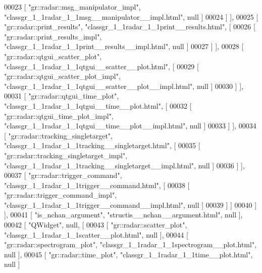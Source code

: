 \begin{DoxyCode}
00023         [ \textcolor{stringliteral}{"gr::radar::msg\_manipulator\_impl"}, \textcolor{stringliteral}{"classgr\_1\_1radar\_1\_1msg\_\_manipulator\_\_impl.html"}, null ]
00024       ] ],
00025       [ \textcolor{stringliteral}{"gr::radar::print\_results"}, \textcolor{stringliteral}{"classgr\_1\_1radar\_1\_1print\_\_results.html"}, [
00026         [ \textcolor{stringliteral}{"gr::radar::print\_results\_impl"}, \textcolor{stringliteral}{"classgr\_1\_1radar\_1\_1print\_\_results\_\_impl.html"}, null ]
00027       ] ],
00028       [ \textcolor{stringliteral}{"gr::radar::qtgui\_scatter\_plot"}, \textcolor{stringliteral}{"classgr\_1\_1radar\_1\_1qtgui\_\_scatter\_\_plot.html"}, [
00029         [ \textcolor{stringliteral}{"gr::radar::qtgui\_scatter\_plot\_impl"}, \textcolor{stringliteral}{"classgr\_1\_1radar\_1\_1qtgui\_\_scatter\_\_plot\_\_impl.html"}, null
       ]
00030       ] ],
00031       [ \textcolor{stringliteral}{"gr::radar::qtgui\_time\_plot"}, \textcolor{stringliteral}{"classgr\_1\_1radar\_1\_1qtgui\_\_time\_\_plot.html"}, [
00032         [ \textcolor{stringliteral}{"gr::radar::qtgui\_time\_plot\_impl"}, \textcolor{stringliteral}{"classgr\_1\_1radar\_1\_1qtgui\_\_time\_\_plot\_\_impl.html"}, null ]
00033       ] ],
00034       [ \textcolor{stringliteral}{"gr::radar::tracking\_singletarget"}, \textcolor{stringliteral}{"classgr\_1\_1radar\_1\_1tracking\_\_singletarget.html"}, [
00035         [ \textcolor{stringliteral}{"gr::radar::tracking\_singletarget\_impl"}, \textcolor{stringliteral}{"classgr\_1\_1radar\_1\_1tracking\_\_singletarget\_\_impl.html"},
       null ]
00036       ] ],
00037       [ \textcolor{stringliteral}{"gr::radar::trigger\_command"}, \textcolor{stringliteral}{"classgr\_1\_1radar\_1\_1trigger\_\_command.html"}, [
00038         [ \textcolor{stringliteral}{"gr::radar::trigger\_command\_impl"}, \textcolor{stringliteral}{"classgr\_1\_1radar\_1\_1trigger\_\_command\_\_impl.html"}, null ]
00039       ] ]
00040     ] ],
00041     [ \textcolor{stringliteral}{"is\_nchan\_argument"}, \textcolor{stringliteral}{"structis\_\_nchan\_\_argument.html"}, null ],
00042     [ \textcolor{stringliteral}{"QWidget"}, null, [
00043       [ \textcolor{stringliteral}{"gr::radar::scatter\_plot"}, \textcolor{stringliteral}{"classgr\_1\_1radar\_1\_1scatter\_\_plot.html"}, null ],
00044       [ \textcolor{stringliteral}{"gr::radar::spectrogram\_plot"}, \textcolor{stringliteral}{"classgr\_1\_1radar\_1\_1spectrogram\_\_plot.html"}, null ],
00045       [ \textcolor{stringliteral}{"gr::radar::time\_plot"}, \textcolor{stringliteral}{"classgr\_1\_1radar\_1\_1time\_\_plot.html"}, null ]

\end{DoxyCode}
